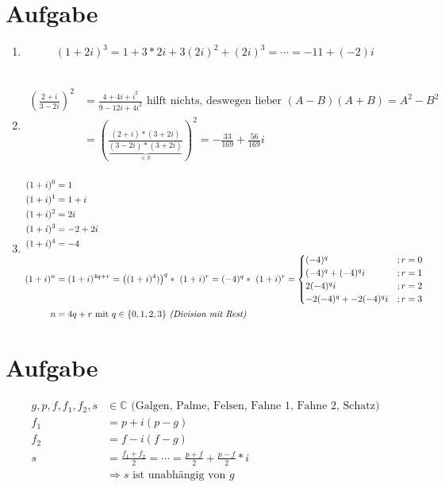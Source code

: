 \documentclass[a4paper,10pt]{article}
\begin{document}
\section{Aufgabe}
\begin{enumerate}
\item \[(1+2i)^3 = 1+3*2i+3(2i)^2+(2i)^3=\cdots=-11+(-2)i\] \\ %

\item \begin{align*}
\left( \frac{2+i}{3-2i} \right)^2 &= \frac{4+4i+i^2}{9-12i+4i^2} \text{ hilft nichts, deswegen lieber }(A-B)(A+B)=A^2-B^2  \\
&= \left( \frac{(2+i) * (3+2i)}{\underbrace{(3-2i) * (3+2i)}_{\in \mathbb{R}}} \right)^2 = -\frac{33}{169} + \frac{56}{169}i \\
\end{align*}

\item \begin{align*}
(1+i)^0 &= 1 \\
(1+i)^1 &= 1+i \\
(1+i)^2 &= 2i \\
(1+i)^3 &= -2+2i \\
(1+i)^4 &= -4 \\
(1+i)^n &= (1+i)^{4q+r} = \left( (1+i)^4) \right)^q * (1+i)^r = (-4)^q  * (1+i)^r = \begin{cases}
(-4)^q &;r=0 \\
(-4)^q + (-4)^qi &;r=1 \\
2(-4)^qi &;r=2 \\
-2(-4)^q + -2(-4)^qi &;r=3
\end{cases} \\
n&=4q+r \text{ mit } q \in \{0,1,2,3\} \text{ \textit{(Division mit Rest)}}
\end{align*}
\end{enumerate}

\section{Aufgabe}
\begin{align*}
g,p,f,f_1,f_2,s &\in \mathbb{C} \text{ (Galgen, Palme, Felsen, Fahne 1, Fahne 2, Schatz)}\\
f_1 &= p + i(p-g)\\
f_2 &= f - i(f-g)\\
s &= \frac{f_1+f_2}{2} = \cdots = \frac{p+f}{2} + \frac{p-f}{2} * i \\
&\Rightarrow s \text{ ist unabh\"angig von }g
\end{align*}
\end{document}
